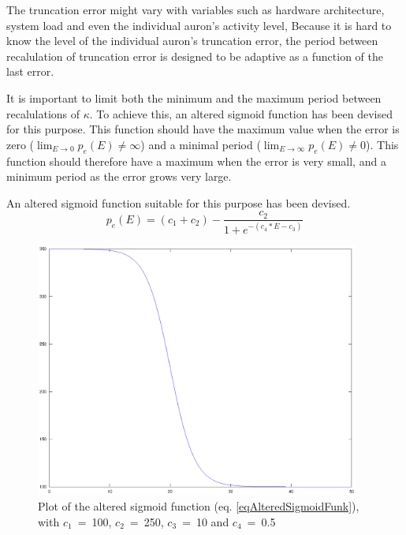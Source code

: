 		The truncation error might vary with variables such as hardware architecture, system load and even the individual auron's activity level,
		Because it is hard to know the level of the individual auron's truncation error, the period between recalulation of truncation error is designed to be adaptive as a function of the last error.

		It is important to limit both the minimum and the maximum period between recalulations of $\kappa$.
		To achieve this, an altered sigmoid function has been devised for this purpose.
		This function should have the maximum value when the error is zero ($\lim_{E \to 0} p_e(E) \neq \infty$) and a minimal period ($\lim_{E\to\infty} p_e(E) \neq 0$).
		This function should therefore have a maximum when the error is very small, and a minimum period as the error grows very large. 

		An altered sigmoid function suitable for this purpose has been devised.
		\begin{equation}
			\label{eqAlteredSigmoidFunk}
			p_e(E) = (c_1+c_2) - \frac{c_2}{1+e^{-(c_4*E-c_3)}}
		\end{equation}


		\begin{figure}[bht!]
			\begin{center}
				\includegraphics[width=0.95\textwidth]{sigmaPlot.eps}
			\end{center}
			\caption{Plot of the altered sigmoid function (eq. \ref{eqAlteredSigmoidFunk}), with \mbox{$c_1$ = 100}, \mbox{$c_2$ = 250}, \mbox{$c_3$ = 10} and \mbox{$c_4$ = 0.5} }
			\label{figAlteredSigmoidFunction}
		\end{figure}
	
